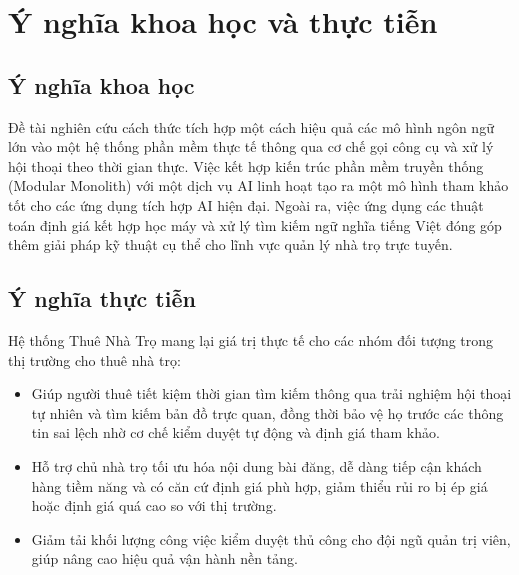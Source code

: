 \section{Ý nghĩa khoa học và thực tiễn}

\FloatBarrier
\subsection{Ý nghĩa khoa học}
Đề tài nghiên cứu cách thức tích hợp một cách hiệu quả các mô hình ngôn ngữ lớn vào một hệ thống phần mềm thực tế thông qua cơ chế gọi công cụ và xử lý hội thoại theo thời gian thực. Việc kết hợp kiến trúc phần mềm truyền thống (Modular Monolith) với một dịch vụ AI linh hoạt tạo ra một mô hình tham khảo tốt cho các ứng dụng tích hợp AI hiện đại. Ngoài ra, việc ứng dụng các thuật toán định giá kết hợp học máy và xử lý tìm kiếm ngữ nghĩa tiếng Việt đóng góp thêm giải pháp kỹ thuật cụ thể cho lĩnh vực quản lý nhà trọ trực tuyến.

\FloatBarrier
\subsection{Ý nghĩa thực tiễn}
Hệ thống Thuê Nhà Trọ mang lại giá trị thực tế cho các nhóm đối tượng trong thị trường cho thuê nhà trọ:
\begin{itemize}
    \item Giúp người thuê tiết kiệm thời gian tìm kiếm thông qua trải nghiệm hội thoại tự nhiên và tìm kiếm bản đồ trực quan, đồng thời bảo vệ họ trước các thông tin sai lệch nhờ cơ chế kiểm duyệt tự động và định giá tham khảo.
    \item Hỗ trợ chủ nhà trọ tối ưu hóa nội dung bài đăng, dễ dàng tiếp cận khách hàng tiềm năng và có căn cứ định giá phù hợp, giảm thiểu rủi ro bị ép giá hoặc định giá quá cao so với thị trường.
    \item Giảm tải khối lượng công việc kiểm duyệt thủ công cho đội ngũ quản trị viên, giúp nâng cao hiệu quả vận hành nền tảng.
\end{itemize}
